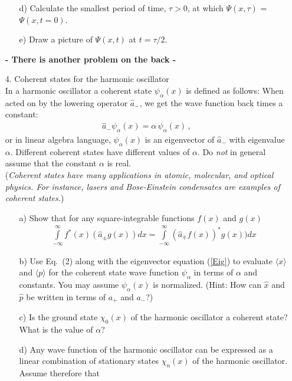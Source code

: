 \documentclass[11pt]{article}
\begin{document}
\begin{itemize}
\begin{itemize}
\item[d)]
Calculate the smallest period of time, $\tau > 0$, at which $\Psi(x,\tau)$ = $\Psi(x,t=0)$.
\item[e)]
Draw a picture of $\Psi(x,t)$ at $t=\tau/2$.
\end{itemize}
%
\vspace*{0.5cm}
%
\centerline{\bf - There is another problem on the back - }
%
\newpage
%
\item[4.] Coherent states for the harmonic oscillator\\
In a harmonic oscillator a coherent state $\psi_\alpha(x)$ is defined as follows: When acted on by the lowering operator ${\hat a}_-$, we get the wave function back times a constant:
\begin{eqnarray}
\label{Eig}
{\hat a}_- \psi_\alpha (x) = \alpha \, \psi_\alpha(x) \,,
\end{eqnarray}
or in linear algebra language, $\psi_\alpha(x)$ is an eigenvector of ${\hat a}_-$ with eigenvalue $\alpha$.
Different coherent states have different values of $\alpha$.  Do {\em not} in general assume that the constant $\alpha$ is real.\\
({\em Coherent states have many applications in atomic, molecular, and optical physics.  For instance, lasers and Bose-Einstein condensates are examples of coherent states.})
%
\begin{itemize}
\item[a)]
Show that for any square-integrable functions $f(x)$ and $g(x)$
\begin{eqnarray}
\int\limits_{-\infty}^{\infty} f^*(x) ({\hat a}_{\pm} g(x)) dx
=  \int\limits_{-\infty}^{\infty} ({\hat a}_{\mp} f(x))^* g(x)) dx
\end{eqnarray}
\item[b)]
Use Eq.\ (2)
along with the eigenvector equation (\ref{Eig}) to evaluate $\langle x \rangle$ and $\langle p \rangle$ for the coherent state wave function $\psi_\alpha$ in terms of $\alpha$ and constants.  You may assume $\psi_\alpha(x)$ is normalized.
(Hint: How can $\hat{x}$ and $\hat{p}$ be written in terms of $a_+$ and $a_-$?)
\item[c)]
Is the ground state $\chi_0(x)$ of the harmonic oscillator a coherent state?  What is the value of $\alpha$?
\item[d)]
Any wave function of the harmonic oscillator can be expressed as a linear combination of
stationary states $\chi_n(x)$ of the harmonic oscillator. Assume therefore that
\begin{eqnarray}

\end{eqnarray}
\end{itemize}
\end{itemize}
\end{document}
